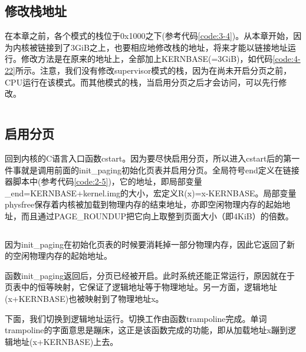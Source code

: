 \documentclass[main.tex]{subfiles}
\begin{document}
\begin{CJK*}{UTF8}{song}
\subsection{修改栈地址}
在本章之前，各个模式的栈位于0x1000之下(参考代码\ref{code:3-4})。从本章开始，因为内核被链接到了3GiB之上，也要相应地修改栈的地址，将来才能以链接地址运行。修改方法是在原来的地址上，全部加上KERNBASE(=3GiB)，如代码\ref{code:4-22}所示。注意，我们没有修改supervisor模式的栈，因为在尚未开启分页之前，CPU运行在该模式。而其他模式的栈，当启用分页之后才会访问，可以先行修改。

\begin{code}
\label{code:4-22}
\inputminted[firstline=127,lastline=144,linenos,numbersep=5pt,frame=lines,framesep=2mm]{gas}{src/chapter04/kernel/entry.S}
\end{code}

\subsection{启用分页}
回到内核的C语言入口函数cstart。因为要尽快启用分页，所以进入cstart后的第一件事就是调用前面的init\_paging初始化页表并启用分页。全局符号end定义在链接器脚本中(参考代码\ref{code:2-5})，它的地址，即局部变量\_end=KERNBASE+kernel.img的大小，宏定义R(x)=x-KERNBASE。局部变量physfree保存着内核被加载到物理内存的结束地址，亦即空闲物理内存的起始地址，而且通过PAGE\_ROUNDUP把它向上取整到页面大小（即4KiB）的倍数。

\begin{code}
\label{code:4-23}
\inputminted[firstline=347,lastline=355,linenos,numbersep=5pt,frame=lines,framesep=2mm]{c}{src/chapter04/kernel/machdep.c}
\end{code}

因为init\_paging在初始化页表的时候要消耗掉一部分物理内存，因此它返回了新的空闲物理内存的起始地址。

\par
函数init\_paging返回后，分页已经被开启。此时系统还能正常运行，原因就在于页表中的恒等映射，它保证了逻辑地址等于物理地址。另一方面，逻辑地址(x+KERNBASE)也被映射到了物理地址x。

\par
下面，我们切换到逻辑地址运行。切换工作由函数trampoline完成。单词trampoline的字面意思是蹦床，这正是该函数完成的功能，即从加载地址x蹦到逻辑地址(x+KERNBASE)上去。

\begin{code}
\label{code:4-24}
\inputminted[firstline=357,lastline=360,linenos,numbersep=5pt,frame=lines,framesep=2mm]{c}{src/chapter04/kernel/machdep.c}
\end{code}


\end{CJK*}
\end{document}
